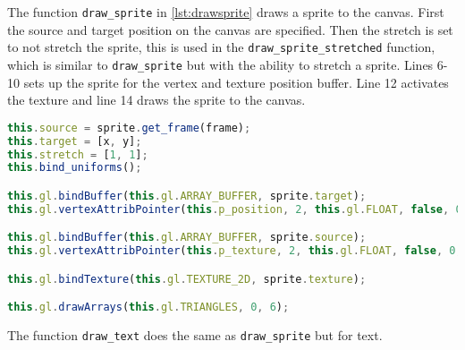 The function \texttt{draw\_sprite} in \autoref{lst:drawsprite} draws a sprite to the canvas. First the source and target position on the canvas are specified. Then the stretch is set to not stretch the sprite, this is used in the \texttt{draw\_sprite\_stretched} function, which is similar to \texttt{draw\_sprite} but with the ability to stretch a sprite. Lines 6-10 sets up the sprite for the vertex and texture position buffer. Line 12 activates the texture and line 14 draws the sprite to the canvas.

\begin{lstlisting}[language=JavaScript, caption=The function \texttt{draw\_sprite}, label=lst:drawsprite]
this.source = sprite.get_frame(frame);
this.target = [x, y];
this.stretch = [1, 1];
this.bind_uniforms();

this.gl.bindBuffer(this.gl.ARRAY_BUFFER, sprite.target);
this.gl.vertexAttribPointer(this.p_position, 2, this.gl.FLOAT, false, 0, 0);

this.gl.bindBuffer(this.gl.ARRAY_BUFFER, sprite.source);
this.gl.vertexAttribPointer(this.p_texture, 2, this.gl.FLOAT, false, 0, 0);

this.gl.bindTexture(this.gl.TEXTURE_2D, sprite.texture);

this.gl.drawArrays(this.gl.TRIANGLES, 0, 6);
\end{lstlisting}

The function \texttt{draw\_text} does the same as \texttt{draw\_sprite} but for text.
